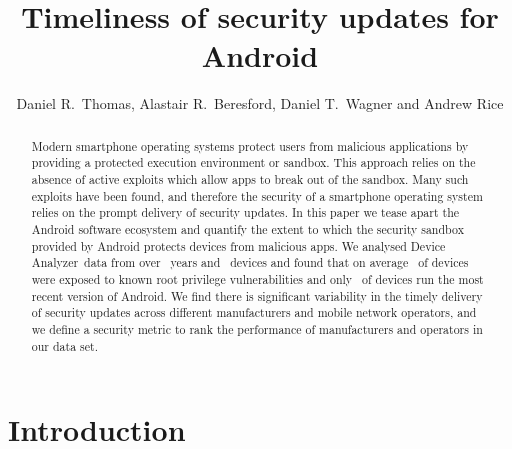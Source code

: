 \documentclass[conference,a4paper,twoside]{IEEEtran}
\author{Daniel R.\ Thomas, Alastair R.\ Beresford, Daniel T.\ Wagner and Andrew Rice}
\newcommand{\da}{Device Analyzer}
\newcommand{\percMarketShare}{83.6\%~\footnote{\url{http://www.theinquirer.net/inquirer/news/2379036/android-hits-836-percent-marketshare-while-ios-windows-and-blackberry-slide}}}
\begin{document}
\title{Timeliness of security updates for Android}


\author{
}




\maketitle


\begin{abstract}
Modern smartphone operating systems protect users from malicious applications by providing a protected execution environment or sandbox.
This approach relies on the absence of active exploits which allow apps to break out of the sandbox.
Many such exploits have been found, and therefore the security of a smartphone operating system relies on the prompt delivery of security updates.
In this paper we tease apart the Android software ecosystem and quantify the extent to which the security sandbox provided by Android protects devices from malicious apps.
We analysed \da\ data from over \daOSYearsOfData\ years and \daNumOSDevices\ devices and found that on average \daMeanInsecurityPercNominal\ of devices were exposed to known root privilege vulnerabilities and only \daUpdatednessPercNominal\ of devices run the most recent version of Android.
We find there is significant variability in the timely delivery of security updates across different manufacturers and mobile network operators, and we define a security metric to rank the performance of manufacturers and operators in our data set.
\end{abstract}

\section{Introduction}
\end{document}
